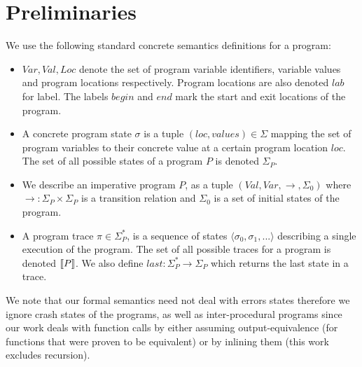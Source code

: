 \section{Preliminaries} 
We use the following standard concrete semantics definitions for a program:
\begin{itemize}
\item $Var,Val,Loc$ denote the set of program variable identifiers, variable values and program locations respectively. Program locations are also denoted $lab$ for label. The labels $begin$ and $end$ mark the start and exit locations of the program.
\item A concrete program state $\sigma$ is a tuple $(loc, values) \in \Sigma$ mapping the set of program variables to their concrete value at a certain program location $loc$. The set of all possible states of a program $P$ is denoted $\Sigma_{P}$.
\item We describe an imperative program $P$, as a tuple $(Val,Var,\rightarrow,\Sigma_{0})$ where $\rightarrow : \Sigma_{P} \times \Sigma_{P} $  is a transition relation and $\Sigma_{0}$ is a set of initial states of the program.
\item A program trace $\pi \in \Sigma^*_{P}$, is a sequence of states $\langle \sigma_0,\sigma_1,... \rangle$ describing a single execution of the program. The set of all possible traces for a program is denoted $\lbrack\!\lbrack P \rbrack\!\rbrack$. We also define $last : \Sigma_{P}^* \rightarrow \Sigma_{P}$ which returns the last state in a trace.
\end{itemize}

%

\begin{sloppypar}
We note that our formal semantics need not deal with errors states therefore we ignore crash states of the programs, as well as inter-procedural programs since our work deals with function calls by either assuming output-equivalence (for functions that were proven to be equivalent) or by inlining them (this work excludes recursion).
\end{sloppypar}

